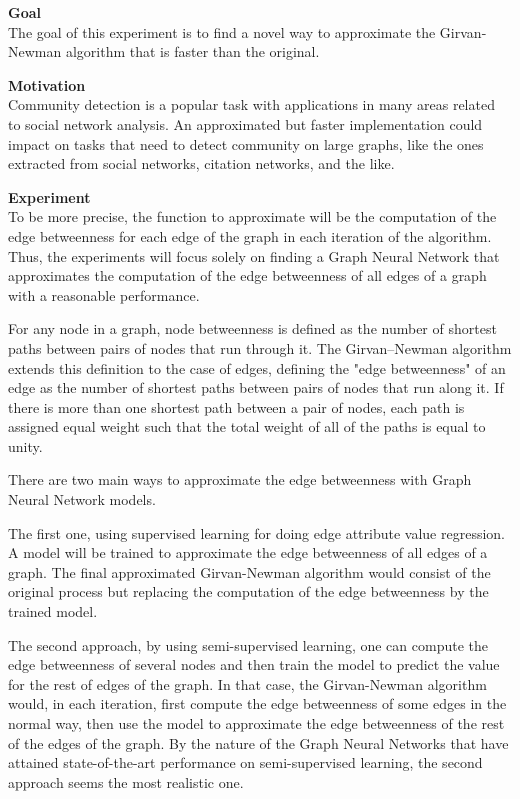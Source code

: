 \textbf{Goal}\\
The goal of this experiment is to find a novel way to approximate the Girvan-Newman algorithm that is faster than the original.


\textbf{Motivation}\\
Community detection is a popular task with applications in many areas related to social network analysis. An approximated but faster implementation could impact on tasks that need to detect community on large graphs, like the ones extracted from social networks, citation networks, and the like.


\textbf{Experiment}\\
To be more precise, the function to approximate will be the computation of the edge betweenness for each edge of the graph in each iteration of the algorithm. Thus, the experiments will focus solely on finding a Graph Neural Network that approximates the computation of the edge betweenness of all edges of a graph with a reasonable performance.

For any node in a graph, node betweenness is defined as the number of shortest paths between pairs of nodes that run through it. The Girvan–Newman algorithm extends this definition to the case of edges, defining the "edge betweenness" of an edge as the number of shortest paths between pairs of nodes that run along it. If there is more than one shortest path between a pair of nodes, each path is assigned equal weight such that the total weight of all of the paths is equal to unity.

There are two main ways to approximate the edge betweenness with Graph Neural Network models. 

The first one, using supervised learning for doing edge attribute value regression. A model will be trained to approximate the edge betweenness of all edges of a graph. The final approximated Girvan-Newman algorithm would consist of the original process but replacing the computation of the edge betweenness by the trained model.


The second approach, by using semi-supervised learning, one can compute the edge betweenness of several nodes and then train the model to predict the value for the rest of edges of the graph. In that case, the Girvan-Newman algorithm would, in each iteration, first compute the edge betweenness of some edges in the normal way, then use the model to approximate the edge betweenness of the rest of the edges of the graph. By the nature of the Graph Neural Networks that have attained state-of-the-art performance on semi-supervised learning, the second approach seems the most realistic one.

